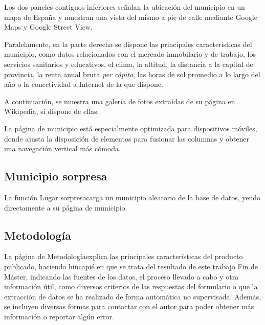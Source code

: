 Los dos paneles contiguos inferiores señalan la ubicación del municipio en un mapa de España y muestran una vista del mismo a pie de calle mediante Google Maps y Google Street View.


Paralelamente, en la parte derecha se dispone las principales características del municipio, como datos relacionados con el mercado inmobilario y de trabajo, los servicios sanitarios y educativos, el clima, la altitud, la distancia a la capital de provincia, la renta anual bruta \textit{per cápita}, las horas de sol promedio a lo largo del año o la conectividad a Internet de la que dispone.

A continuación, se muestra una galería de fotos extraídas de su página en Wikipedia, si dispone de ellas.

La página de municipio está especialmente optimizada para dispositivos móviles, donde ajusta la disposición de elementos para fusionar las columnas y obtener una navegación vertical más cómoda.


\subsection{Municipio sorpresa}

La función \guillemotleft Lugar sorpresa\guillemotright\space carga un municipio aleatorio de la base de datos, yendo directamente a su página de municipio.

\subsection{Metodología}

La página de \guillemotleft Metodología\guillemotright\space explica las principales características del producto publicado, haciendo hincapié en que se trata del resultado de este trabajo Fin de Máster, indicando las fuentes de los datos, el proceso llevado a cabo y otra información útil, como diversos criterios de las respuestas del formulario o que la extracción de datos se ha realizado de forma automática no supervisada. Además, se incluyen diversas formas para contactar con el autor para poder obtener más información o reportar algún error.

